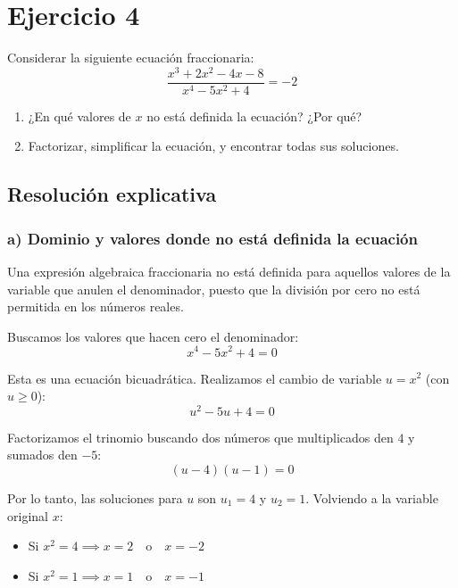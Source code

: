 \documentclass[11pt,a4paper]{article}
\begin{document}
\section*{Ejercicio 4}

\begin{tcolorbox}[colback=gray!5!white,colframe=gray!75!black,title=\textbf{Enunciado}]
Considerar la siguiente ecuación fraccionaria:
\begin{equation*}
    \frac{x^{3}+2x^{2}-4x-8}{x^{4}-5x^{2}+4} = -2
\end{equation*}
\begin{enumerate}[label=\textbf{\alph*)}]
    \item ¿En qué valores de $x$ no está definida la ecuación? ¿Por qué?
    \item Factorizar, simplificar la ecuación, y encontrar todas sus soluciones.
\end{enumerate}
\end{tcolorbox}

\subsection*{Resolución explicativa}

\subsubsection*{a) Dominio y valores donde no está definida la ecuación}

Una expresión algebraica fraccionaria no está definida para aquellos valores de la variable que anulen el denominador, puesto que la división por cero no está permitida en los números reales.

Buscamos los valores que hacen cero el denominador:
\begin{equation*}
    x^4 - 5x^2 + 4 = 0
\end{equation*}

Esta es una ecuación bicuadrática. Realizamos el cambio de variable $u = x^2$ (con $u \ge 0$):
\begin{equation*}
    u^2 - 5u + 4 = 0
\end{equation*}

Factorizamos el trinomio buscando dos números que multiplicados den $4$ y sumados den $-5$:
\begin{equation*}
    (u - 4)(u - 1) = 0
\end{equation*}

Por lo tanto, las soluciones para $u$ son $u_1 = 4$ y $u_2 = 1$. Volviendo a la variable original $x$:
\begin{itemize}
    \item Si $x^2 = 4 \implies x = 2 \quad \text{o} \quad x = -2$
    \item Si $x^2 = 1 \implies x = 1 \quad \text{o} \quad x = -1$
\end{itemize}
\end{document}
